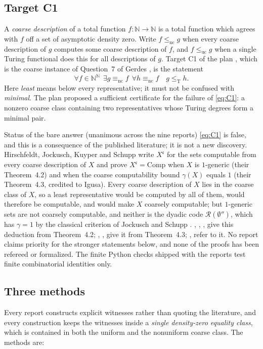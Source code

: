 \documentclass[11pt,letterpaper]{article}
\theoremstyle{definition}
\numberwithin{equation}{section}
\newcommand{\N}{\mathbb N}
\newcommand{\Baire}{\N^{\N}}
\newcommand{\leT}{\le_{\mathrm T}}
\newcommand{\lenc}{\le_{\mathrm{nc}}}
\newcommand{\leuc}{\le_{\mathrm{uc}}}
\newcommand{\eqnc}{\equiv_{\mathrm{nc}}}
\newcommand{\Comp}{\mathrm{Comp}}
\newcommand{\Rc}{\mathcal R}
\newcommand{\rep}[1]{\leavevmode{\sffamily\small\color{Steel}R#1}}
\begin{document}
\subsection{Target C1}
A \emph{coarse description} of a total function $f:\N\to\N$ is a total function which agrees with $f$ off a set of asymptotic density zero. Write $f\lenc g$ when every coarse description of $g$ computes some coarse description of $f$, and $f\leuc g$ when a single Turing functional does this for all descriptions of $g$. Target C1 of the plan \cite{Plan}, which is the coarse instance of Question~7 of Gerdes \cite{Gerdes}, is the statement
\begin{equation}\tag{C1}\label{eq:C1}
 \forall f\in\Baire\ \ \exists g\eqnc f\ \ \forall h\eqnc f\quad g\leT h .
\end{equation}
Here \emph{least} means below every representative; it must not be confused with \emph{minimal}. The plan proposed a sufficient certificate for the failure of \eqref{eq:C1}: a nonzero coarse class containing two representatives whose Turing degrees form a minimal pair.

\begin{assessment}{Status of the bare answer (unanimous across the nine reports)}
\eqref{eq:C1} is false, and this is a consequence of the published literature; it is not a new discovery. Hirschfeldt, Jockusch, Kuyper and Schupp \cite{HJKS} write $X^{\mathfrak c}$ for the sets computable from every coarse description of $X$ and prove $X^{\mathfrak c}=\Comp$ when $X$ is $1$-generic (their Theorem~4.2) and when the coarse computability bound $\gamma(X)$ equals $1$ (their Theorem~4.3, credited to Igusa). Every coarse description of $X$ lies in the coarse class of $X$, so a least representative would be computed by all of them, would therefore be computable, and would make $X$ coarsely computable; but $1$-generic sets are not coarsely computable, and neither is the dyadic code $\Rc(\emptyset'')$, which has $\gamma=1$ by the classical criterion of Jockusch and Schupp \cite[Theorem~2.19]{JS}. \rep1, \rep2, \rep5, \rep6 give this deduction from Theorem~4.2; \rep3, \rep4, \rep9 give it from Theorem~4.3; \rep7, \rep8 refer to it. No report claims priority for the stronger statements below, and none of the proofs has been refereed or formalized. The finite Python checks shipped with the reports test finite combinatorial identities only.
\end{assessment}

\subsection{Three methods}
Every report constructs explicit witnesses rather than quoting the literature, and every construction keeps the witnesses inside a \emph{single density-zero equality class}, which is contained in both the uniform and the nonuniform coarse class. The methods are:
\end{document}
